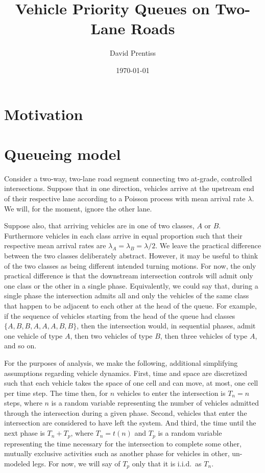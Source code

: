 \documentclass{amsart}
\begin{document}
\title{Vehicle Priority Queues on Two-Lane Roads}
\author{David Prentiss}
\date{\today}
\maketitle
\section{Motivation}
\section{Queueing model}
Consider a two-way, two-lane road segment connecting two at-grade, controlled
intersections. Suppose that in one direction, vehicles arrive at the upstream
end of their respective lane according to a Poisson process with mean arrival
rate $\lambda$. We will, for the moment, ignore the other lane.

Suppose also, that arriving vehicles are in one of two classes, $A$ or $B$.
Furthermore vehicles in each class arrive in equal proportion such that their
respective mean arrival rates are $\lambda_A=\lambda_B=\lambda/2$. We leave the
practical difference between the two classes deliberately abstract. However, it
may be useful to think of the two classes as being different intended turning
motions. For now, the only practical difference is that the downstream
intersection controls will admit only one class or the other in a single phase.
Equivalently, we could say that, during a single phase the intersection admits
all and only the vehicles of the same class that happen to be adjacent to each
other at the head of the queue. For example, if the sequence of vehicles
starting from the head of the queue had classes $\{A,B,B,A,A,A,B,B\}$, then the
intersection would, in sequential phases, admit one vehicle of type $A$, then
two vehicles of type $B$, then three vehicles of type $A$, and so on.


For the purposes of analysis, we make the following, additional simplifying
assumptions regarding vehicle dynamics. First, time and space are discretized
such that each vehicle takes the space of one cell and can move, at most, one
cell per time step. The time then, for $n$ vehicles to enter the intersection is
$T_n=n$ steps, where $n$ is a random variable representing the number of
vehicles admitted through the intersection during a given phase. Second,
vehicles that enter the intersection are considered to have left the system. And
third, the time until the next phase is $T_n+T_p$, where $T_n = t(n)$ and $T_p$
is a random variable representing the time necessary for the intersection to
complete some other, mutually exclusive activities such as another phase for
vehicles in other, un-modeled legs. For now, we will say of $T_p$ only that it
is i.i.d.\ as $T_n$.
\end{document}
